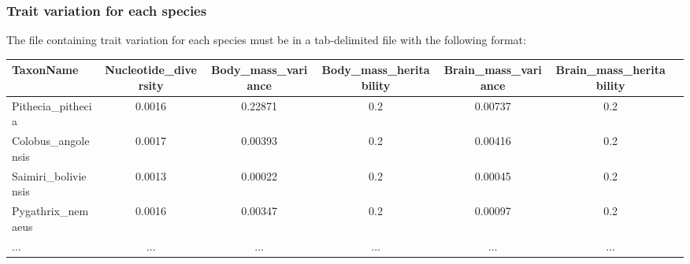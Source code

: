 \documentclass{article}
\begin{document}
\subsubsection{Trait variation for each species}\label{subsubsec:trait-variation-for-each-species}

The file containing trait variation for each species must be in a tab-delimited file with the following format:

\begin{table}[h]
    \centering
    \begin{adjustbox}{width = 1.0\textwidth}
    \begin{tabular}{|l|c|c|c|c|c|c|}
        \hline
        TaxonName & Nucleotide\_diversity & Body\_mass\_variance & Body\_mass\_heritability & Brain\_mass\_variance & Brain\_mass\_heritability \\
        \hline
        Pithecia\_pithecia & 0.0016 & 0.22871 & 0.2 & 0.00737 & 0.2 \\
        Colobus\_angolensis & 0.0017 & 0.00393 & 0.2 & 0.00416 & 0.2 \\
        Saimiri\_boliviensis & 0.0013 & 0.00022 & 0.2 & 0.00045 & 0.2 \\
        Pygathrix\_nemaeus & 0.0016 & 0.00347 & 0.2 & 0.00097 & 0.2 \\
        $\hdots$ & $\hdots$ & $\hdots$ & $\hdots$ & $\hdots$ & $\hdots$ \\
        \hline
    \end{tabular}
    \end{adjustbox}\label{tab:trait-variance}
\end{table}
\end{document}
